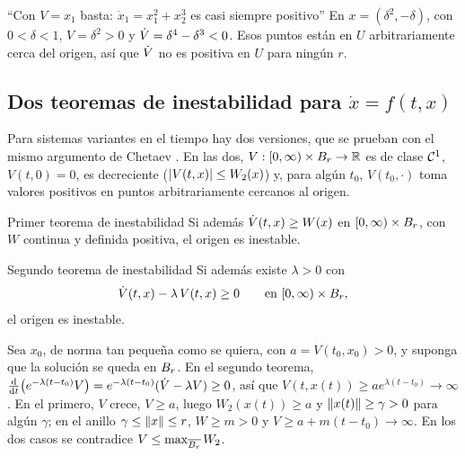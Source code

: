 \begin{trampa}[label=tr:vt-cetaevx1]{``Con $V=x_1$ basta: $\dot x_1=x_1^2+x_2^3$ es casi siempre positivo''}
En $x=(\delta^2,-\delta)$, con $0<\delta<1$, $V=\delta^2>0$ y $\dot V=\delta^4-\delta^3<0$. Esos puntos están en $U$ arbitrariamente cerca del origen, así que $\dot V$ no es positiva en $U$ para ningún $r$.
\end{trampa}

\subsection{Dos teoremas de inestabilidad para $\dot x=f(t,x)$}

Para sistemas variantes en el tiempo hay dos versiones, que se prueban con el mismo argumento de Chetaev \citep{SlLi91}. En las dos, $V:[0,\infty)\times B_{r}\to\mathbb{R}$ es de clase $\mathcal{C}^{1}$, $V(t,0)=0$, es decreciente ($\left\lvert V(t,x)\right\rvert\le W_2(x)$) y, para algún $t_0$, $V(t_0,\cdot)$ toma valores positivos en puntos arbitrariamente cercanos al origen.

\begin{teorema}[label=thm:vt-inestable1]{Primer teorema de inestabilidad}
Si además $\dot V(t,x)\ge W(x)$ en $[0,\infty)\times B_{r}$, con $W$ continua y definida positiva, el origen es inestable.
\end{teorema}

\begin{teorema}[label=thm:vt-inestable2]{Segundo teorema de inestabilidad}
Si además existe $\lambda>0$ con
\[
  \dot V(t,x)-\lambda\,V(t,x)\ge0\qquad\text{en }[0,\infty)\times B_{r} ,
\]
el origen es inestable.
\end{teorema}

\begin{demostracion}
Sea $x_0$, de norma tan pequeña como se quiera, con $a=V(t_0,x_0)>0$, y suponga que la solución se queda en $B_{r}$. En el segundo teorema, $\frac{\mathrm{d}}{\mathrm{d} t}\bigl(e^{-\lambda(t-t_0)}V\bigr)=e^{-\lambda(t-t_0)}(\dot V-\lambda V)\ge0$, así que $V(t,x(t))\ge ae^{\lambda(t-t_0)}\to\infty$. En el primero, $V$ crece, $V\ge a$, luego $W_2(x(t))\ge a$ y $\left\lVert x(t)\right\rVert\ge\gamma>0$ para algún $\gamma$; en el anillo $\gamma\le\left\lVert x\right\rVert\le r$, $W\ge m>0$ y $V\ge a+m(t-t_0)\to\infty$. En los dos casos se contradice $V\le\max_{\overline{B_{r}}}W_2$.
\end{demostracion}

